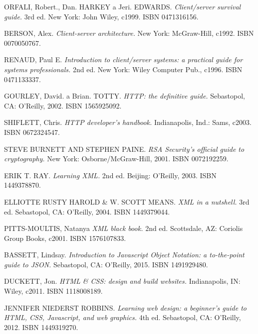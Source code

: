 \begingroup
\begin{thebibliography}{99}
	
 ORFALI, Robert., Dan. HARKEY a Jeri. EDWARDS. 
\textit{Client/server survival guide.}
3rd ed. New York: John Wiley, c1999. ISBN 0471316156.

 BERSON, Alex. 
\textit{Client-server architecture.}
New York: McGraw-Hill, c1992. ISBN 0070050767.

 RENAUD, Paul E.
\textit{Introduction to client/server systems: a practical guide for systems professionals.}
2nd ed. New York: Wiley Computer Pub., c1996. ISBN 0471133337.

 GOURLEY, David. a Brian. TOTTY.  
\textit{HTTP: the definitive guide. }
Sebastopol, CA: O'Reilly, 2002. ISBN 1565925092.

 SHIFLETT, Chris. 
\textit{HTTP developer's handbook.}
Indianapolis, Ind.: Sams, c2003. ISBN 0672324547.

 STEVE BURNETT AND STEPHEN PAINE.
\textit{RSA Security's official guide to cryptography.}
New York: Osborne/McGraw-Hill, 2001. ISBN 0072192259.

 ERIK T. RAY. 
\textit{Learning XML.} 
2nd ed. Beijing: O'Reilly, 2003. ISBN 1449378870.

 ELLIOTTE RUSTY HAROLD \& W. SCOTT MEANS. 
\textit{XML in a nutshell.} 
3rd ed. Sebastopol, CA: O'Reilly, 2004. ISBN 1449379044.

 PITTS-MOULTIS, Natanya
\textit{XML black book.} 
2nd ed. Scottsdale, AZ: Coriolis Group Books, c2001. ISBN 1576107833.

 BASSETT, Lindsay.
\textit{Introduction to Javascript Object Notation: a to-the-point guide to JSON.}
Sebastopol, CA: O'Reilly, 2015. ISBN 1491929480.

 DUCKETT, Jon.
\textit{HTML \& CSS: design and build websites.}
Indianapolis, IN: Wiley, c2011. ISBN 1118008189.

 JENNIFER NIEDERST ROBBINS.
\textit{Learning web design: a beginner's guide to HTML, CSS, Javascript, and web graphics. }
4th ed. Sebastopol, CA: O'Reilly, 2012. ISBN 1449319270.


\end{thebibliography}
